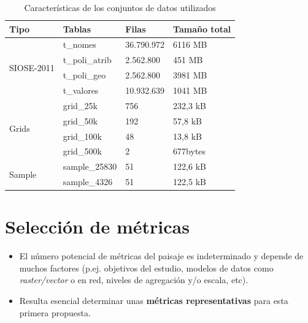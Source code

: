 \begin{table}[]
\centering
\caption{Características de los conjuntos de datos utilizados\label{tab:datos}}
\begin{tabular}{@{}llll@{}}
\toprule
\textbf{Tipo}               & \textbf{Tablas} & \textbf{Filas} & \textbf{Tamaño total} \\ \midrule
\multirow{4}{*}{SIOSE-2011} & t\_nomes        & 36.790.972     & 6116 MB               \\
                            & t\_poli\_atrib  & 2.562.800      & 451 MB                \\
                            & t\_poli\_geo    & 2.562.800      & 3981 MB               \\
                            & t\_valores      & 10.932.639     & 1041 MB               \\ \midrule
\multirow{4}{*}{Grids}      & grid\_25k       & 756            & 232,3 kB              \\
                            & grid\_50k       & 192            & 57,8 kB               \\
                            & grid\_100k      & 48             & 13,8 kB               \\
                            & grid\_500k      & 2              & 677bytes              \\ \midrule
\multirow{2}{*}{Sample}     & sample\_25830   & 51             & 122,6 kB              \\
                            & sample\_4326    & 51             & 122,5 kB              \\ \bottomrule
\end{tabular}
\end{table}





\section{Selección de métricas}

\begin{graybox}
\begin{itemize}
\item El número potencial de métricas del paisaje es indeterminado y depende de muchos factores (p.ej. objetivos del estudio, modelos de datos como \textit{raster/vector} o en red, niveles de agregación y/o escala, etc).
\item Resulta esencial determinar unas \textbf{métricas representativas} para esta primera propuesta.
\end{itemize}
\end{graybox}

